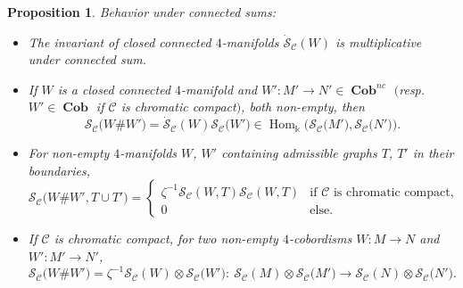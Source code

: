 \documentclass[10pt,a4paper]{amsart}
\newtheorem{proposition}{Proposition}
\numberwithin{equation}{section}
\numberwithin{theorem}{section}
\numberwithin{proposition}{section}
\numberwithin{definition}{section}
\numberwithin{lemma}{section}
\numberwithin{corollary}{section}
\numberwithin{remark}{section}
\numberwithin{example}{section}
\newcommand{\cat}{\mathcal{C}}
\newcommand{\Hom}{\operatorname{Hom}}
\newcommand{\FK}{{\Bbbk}}
\newcommand{\TSkein}{{\mathscr{S}}}
\newcommand{\cob}{\operatorname{\textbf{Cob}}}
\begin{document}
\begin{proposition}\label{P:conn} Behavior under connected sums:
 \begin{itemize}\itemsep=0pt
 \item The invariant of closed connected $4$-manifolds
 $\dot\TSkein_\cat(W)$ is multiplicative under connected sum.
 \item If $W$ is a closed connected $4$-manifold and
 $W'\colon M'\to N'\in\cob^{nc}$ $($resp. $W'\in\cob$ if $\cat$ is chromatic compact$)$, both non-empty, then
 \[
 \TSkein_\cat\bigl(W\#W'\bigr)=\dot\TSkein_\cat(W)\TSkein_\cat\bigl(W'\bigr)
 \in\Hom_\FK\bigl(\TSkein_\cat\bigl(M'\bigr),\TSkein_\cat\bigl(N'\bigr)\bigr).
 \]
 \item For non-empty $4$-manifolds $W$, $W'$ containing admissible graphs
 $T$, $T'$ in their boundaries,
 \[\TSkein_\cat\bigl(W\#W',T\cup T'\bigr)=
 \begin{cases}
 \zeta^{-1}\TSkein_\cat(W,T)\TSkein_\cat(W,T)&\text{if $\cat$ is chromatic compact,}\\
 0&\text{else.}
 \end{cases}\]

 \item If $\cat$ is chromatic compact, for two non-empty $4$-cobordisms
 $W\colon\! M\to N$ and ${W'\colon\! M'\to N'}$,
 \[
 \TSkein_\cat\bigl(W\#W'\bigr)=\zeta^{-1}\TSkein_\cat(W)\otimes\TSkein_\cat\bigl(W'\bigr)\colon \
 \TSkein_\cat(M)\otimes\TSkein_\cat\bigl(M'\bigr)\to\TSkein_\cat(N)\otimes\TSkein_\cat\bigl(N'\bigr).
 \]
 \end{itemize}
\end{proposition}
\end{document}
